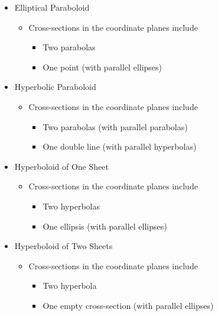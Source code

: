 \documentclass[12pt]{article}
\newcommand{\<}{\left<}
\renewcommand{\>}{\right>}
\begin{document}
\begin{itemize}
\item Elliptical Paraboloid
  \begin{itemize}
  \item Cross-sections in the coordinate planes include
    \begin{itemize}
    \item Two parabolas
    \item One point (with parallel ellipses)
    \end{itemize}
  \end{itemize}
\newpage
\item Hyperbolic Paraboloid
  \begin{itemize}
  \item Cross-sections in the coordinate planes include
    \begin{itemize}
    \item Two parabolas (with parallel parabolas)
    \item One double line (with parallel hyperbolas)
    \end{itemize}
  \end{itemize}

\item Hyperboloid of One Sheet
  \begin{itemize}
  \item Cross-sections in the coordinate planes include
    \begin{itemize}
    \item Two hyperbolas
    \item One ellipsis (with parallel ellipses)
    \end{itemize}
  \end{itemize}

\item Hyperboloid of Two Sheets
  \begin{itemize}
  \item Cross-sections in the coordinate planes include
    \begin{itemize}
    \item Two hyperbola
    \item One empty cross-section (with parallel ellipses)
    \end{itemize}
  \end{itemize}

\end{itemize}
\end{document}
